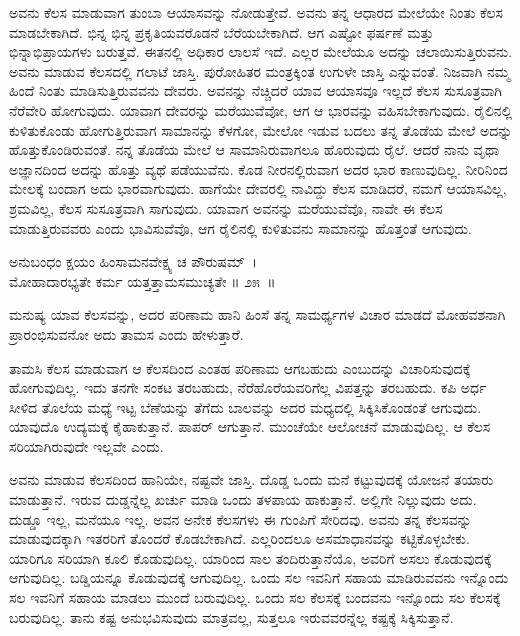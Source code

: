 ಅವನು ಕೆಲಸ ಮಾಡುವಾಗ ತುಂಬಾ ಆಯಾಸವನ್ನು ನೋಡುತ್ತೇವೆ. ಅವನು ತನ್ನ ಆಧಾರದ ಮೇಲೆಯೇ ನಿಂತು ಕೆಲಸ ಮಾಡಬೇಕಾಗಿದೆ. ಭಿನ್ನ ಭಿನ್ನ ಪ್ರಕೃತಿಯವರೊಡನೆ ಬೆರೆಯಬೇಕಾಗಿದೆ. ಆಗ ಎಷ್ಟೋ ಫರ್ಷಣೆ ಮತ್ತು ಭಿನ್ನಾಭಿಪ್ರಾಯಗಳು ಬರುತ್ತವೆ. ಈತನಲ್ಲಿ ಅಧಿಕಾರ ಲಾಲಸೆ ಇದೆ. ಎಲ್ಲರ ಮೇಲೆಯೂ ಅದನ್ನು ಚಲಾಯಿಸುತ್ತಿರುವನು. ಅವನು ಮಾಡುವ ಕೆಲಸದಲ್ಲಿ ಗಲಾಟೆ ಜಾಸ್ತಿ. ಪುರೋಹಿತರ ಮಂತ್ರಕ್ಕಿಂತ ಉಗುಳೇ ಜಾಸ್ತಿ ಎನ್ನುವಂತೆ. ನಿಜವಾಗಿ ನಮ್ಮ ಹಿಂದೆ ನಿಂತು ಮಾಡಿಸುತ್ತಿರುವವನು ದೇವರು. ಅವನನ್ನು ನೆಚ್ಚಿದರೆ ಯಾವ ಆಯಾಸವೂ ಇಲ್ಲದೆ ಕೆಲಸ ಸುಸೂತ್ರವಾಗಿ ನೆರೆವೇರಿ ಹೋಗುವುದು. ಯಾವಾಗ ದೇವರನ್ನು ಮರೆಯುವೆವೋ, ಆಗ ಆ ಭಾರವನ್ನು ವಹಿಸಬೇಕಾಗುವುದು. ರೈಲಿನಲ್ಲಿ ಕುಳಿತುಕೊಂಡು ಹೋಗುತ್ತಿರುವಾಗ ಸಾಮಾನನ್ನು ಕೆಳಗೋ, ಮೇಲೋ ಇಡುವ ಬದಲು ತನ್ನ ತೊಡೆಯ ಮೇಲೆ ಅದನ್ನು ಹೊತ್ತುಕೊಂಡಿರುವಂತೆ. ನನ್ನ ತೊಡೆಯ ಮೇಲೆ ಆ ಸಾಮಾನಿರುವಾಗಲೂ ಹೊರುವುದು ರೈಲೆ. ಆದರೆ ನಾನು ವೃಥಾ ಅಜ್ಞಾನದಿಂದ ಅದನ್ನು ಹೊತ್ತು ವ್ಯಥೆ ಪಡೆಯುವೆನು. ಕೊಡ ನೀರನಲ್ಲಿರುವಾಗ ಅದರ ಭಾರ ಕಾಣುವುದಿಲ್ಲ. ನೀರಿನಿಂದ ಮೇಲಕ್ಕೆ ಬಂದಾಗ ಅದು ಭಾರವಾಗುವುದು. ಹಾಗೆಯೇ ದೇವರಲ್ಲಿ ನಾವಿದ್ದು ಕೆಲಸ ಮಾಡಿದರೆ, ನಮಗೆ ಆಯಾಸವಿಲ್ಲ, ಶ್ರಮವಿಲ್ಲ, ಕೆಲಸ ಸುಸೂತ್ರವಾಗಿ ಸಾಗುವುದು. ಯಾವಾಗ ಅವನನ್ನು ಮರೆಯುವೆವೊ, ನಾವೇ ಈ ಕೆಲಸ ಮಾಡುತ್ತಿರುವವರು ಎಂದು ಭಾವಿಸುವೆವೊ, ಆಗ ರೈಲಿನಲ್ಲಿ ಕುಳಿತುವನು ಸಾಮಾನನ್ನು ಹೊತ್ತಂತೆ ಆಗುವುದು.

\begin{shloka}
ಅನುಬಂಧಂ ಕ್ಷಯಂ ಹಿಂಸಾಮನವೇಕ್ಷ್ಯ ಚ ಪೌರುಷಮ್~।\\ಮೋಹಾದಾರಭ್ಯತೇ ಕರ್ಮ ಯತ್ತತ್ತಾಮಸಮುಚ್ಯತೇ \hfill॥ ೨೫~॥
\end{shloka}

\begin{artha}
ಮನುಷ್ಯ ಯಾವ ಕೆಲಸವನ್ನು, ಅದರ ಪರಿಣಾಮ ಹಾನಿ ಹಿಂಸೆ ತನ್ನ ಸಾಮರ್ಥ್ಯಗಳ ವಿಚಾರ ಮಾಡದೆ ಮೋಹವಶನಾಗಿ ಪ್ರಾರಂಭಿಸುವನೋ ಅದು ತಾಮಸ ಎಂದು ಹೇಳುತ್ತಾರೆ.
\end{artha}

ತಾಮಸಿ ಕೆಲಸ ಮಾಡುವಾಗ ಆ ಕೆಲಸದಿಂದ ಎಂತಹ ಪರಿಣಾಮ ಆಗಬಹುದು ಎಂಬುದನ್ನು ವಿಚಾರಿಸುವುದಕ್ಕೆ ಹೋಗುವುದಿಲ್ಲ. ಇದು ತನಗೇ ಸಂಕಟ ತರಬಹುದು, ನೆರೆಹೊರೆಯವರಿ\-ಗೆಲ್ಲ ವಿಪತ್ತನ್ನು ತರಬಹುದು. ಕಪಿ ಅರ್ಧ ಸೀಳಿದ ತೊಲೆಯ ಮಧ್ಯೆ ಇಟ್ಟ ಬೆಣೆಯನ್ನು ತೆಗೆದು ಬಾಲವನ್ನು ಅದರ ಮಧ್ಯದಲ್ಲಿ ಸಿಕ್ಕಿಸಿಕೊಂಡಂತೆ ಆಗುವುದು. ಯಾವುದೊ ಉದ್ಯಮಕ್ಕೆ ಕೈಹಾಕುತ್ತಾನೆ. ಪಾಪರ್ ಆಗುತ್ತಾನೆ. ಮುಂಚೆಯೇ ಆಲೋಚನೆ ಮಾಡುವುದಿಲ್ಲ. ಆ ಕೆಲಸ ಸರಿಯಾಗಿರುವುದೇ ಇಲ್ಲವೇ ಎಂದು.

ಅವನು ಮಾಡುವ ಕೆಲಸದಿಂದ ಹಾನಿಯೇ, ನಷ್ಟವೇ ಜಾಸ್ತಿ. ದೊಡ್ಡ ಒಂದು ಮನೆ ಕಟ್ಟುವುದಕ್ಕೆ ಯೋಜನೆ ತಯಾರು ಮಾಡುತ್ತಾನೆ. ಇರುವ ದುಡ್ಡನ್ನೆಲ್ಲ ಖರ್ಚು ಮಾಡಿ ಒಂದು ತಳಪಾಯ ಹಾಕುತ್ತಾನೆ. ಅಲ್ಲಿಗೇ ನಿಲ್ಲುವುದು ಅದು. ದುಡ್ಡೂ ಇಲ್ಲ, ಮನೆಯೂ ಇಲ್ಲ. ಅವನ ಅನೇಕ ಕೆಲಸಗಳು ಈ ಗುಂಪಿಗೆ ಸೇರಿದವು. ಅವನು ತನ್ನ ಕೆಲಸವನ್ನು ಮಾಡುವುದಕ್ಕಾಗಿ ಇತರರಿಗೆ ತೊಂದರೆ ಕೊಡಬೇಕಾಗಿದೆ. ಎಲ್ಲರಿಂದಲೂ ಅಸಮಾಧಾನವನ್ನು ಕಟ್ಟಿಕೊಳ್ಳಬೇಕು. ಯಾರಿಗೂ ಸರಿಯಾಗಿ ಕೂಲಿ ಕೊಡುವುದಿಲ್ಲ. ಯಾರಿಂದ ಸಾಲ ತಂದಿರುತ್ತಾನೆಯೊ, ಅವರಿಗೆ ಅಸಲು ಕೊಡುವುದಕ್ಕೆ ಆಗುವುದಿಲ್ಲ. ಬಡ್ಡಿಯನ್ನೂ ಕೊಡುವುದಕ್ಕೆ ಆಗುವುದಿಲ್ಲ. ಒಂದು ಸಲ ಇವನಿಗೆ ಸಹಾಯ ಮಾಡಿರುವವನು ಇನ್ನೊಂದು ಸಲ ಇವನಿಗೆ ಸಹಾಯ ಮಾಡಲು ಮುಂದೆ ಬರುವುದಿಲ್ಲ. ಒಂದು ಸಲ ಕೆಲಸಕ್ಕೆ ಬಂದವನು ಇನ್ನೊಂದು ಸಲ ಕೆಲಸಕ್ಕೆ ಬರುವುದಿಲ್ಲ. ತಾನು ಕಷ್ಟ ಅನುಭವಿಸುವುದು ಮಾತ್ರವಲ್ಲ, ಸುತ್ತಲೂ ಇರುವವರನ್ನೆಲ್ಲ ಕಷ್ಟಕ್ಕೆ ಸಿಕ್ಕಿಸುತ್ತಾನೆ.

